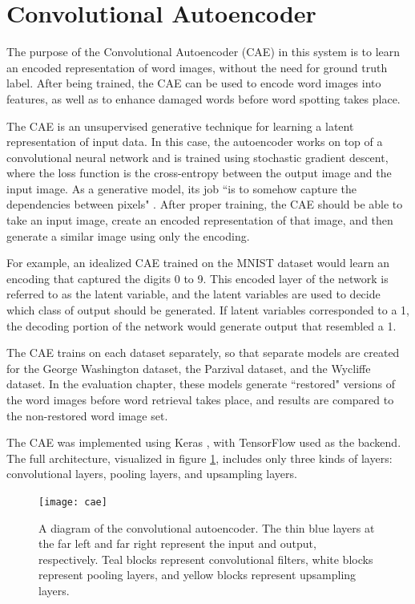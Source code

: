 \documentclass[final]{ukthesis}
\begin{document}
%
%
\section{Convolutional Autoencoder}
\label{sec:cae}

The purpose of the Convolutional Autoencoder (CAE) \cite{masci2011stacked} in this system is to learn an encoded representation of word images, without the need for ground truth label. After being trained, the CAE can be used to encode word images into features, as well as to enhance damaged words before word spotting takes place.

The CAE is an unsupervised generative technique for learning a latent representation of input data. In this case, the autoencoder works on top of a convolutional neural network and is trained using stochastic gradient descent, where the loss function is the cross-entropy between the output image and the input image. As a generative model, its job ``is to somehow capture the dependencies between pixels" \cite{doersch2016tutorial}. After proper training, the CAE should be able to take an input image, create an encoded representation of that image, and then generate a similar image using only the encoding.

For example, an idealized CAE trained on the MNIST dataset would learn an encoding that captured the digits 0 to 9. This encoded layer of the network is referred to as the latent variable, and the latent variables are used to decide which class of output should be generated. If latent variables corresponded to a 1, the decoding portion of the network would generate output that resembled a 1.

The CAE trains on each dataset separately, so that separate models are created for the George Washington dataset, the Parzival dataset, and the Wycliffe dataset. In the evaluation chapter, these models generate ``restored" versions of the word images before word retrieval takes place, and results are compared to the non-restored word image set.

The CAE was implemented using Keras \cite{chollet2015keras}, with TensorFlow \cite{abadi2016tensorflow} used as the backend. The full architecture, visualized in figure \ref{fig:cae-schematic}, includes only three kinds of layers: convolutional layers, pooling layers, and upsampling layers.

\begin{figure}[t]
\begin{center}
\texttt{[image: cae]}
\end{center}
\caption{A diagram of the convolutional autoencoder. The thin blue layers at the far left and far right represent the input and output, respectively. Teal blocks represent convolutional filters, white blocks represent pooling layers, and yellow blocks represent upsampling layers.}
\label{fig:cae-schematic}
\end{figure}
\end{document}
